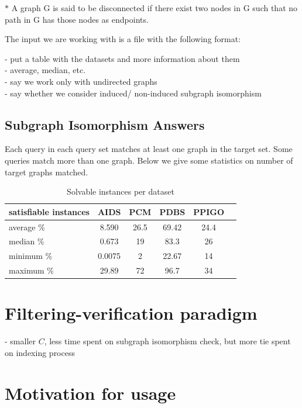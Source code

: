 \documentclass{l4proj}
\begin{document}
\small{$*$ A graph G is said to be disconnected if there exist two nodes in G such that no path in G has those nodes as endpoints.}

    The input we are working with is a file with the following format:\newline
    
    - put a table with the datasets and more information about them \\ 
    - average, median, etc. \\
    - say we work only with undirected graphs \\
    - say whether we consider induced/ non-induced subgraph isomorphism \\

\subsection{Subgraph Isomorphism Answers}
Each query in each query set matches at least one graph in the target set. Some queries match more than one graph. Below we give some statistics on number of target graphs matched.
\begin{table}[H]
\caption{Solvable instances per dataset}
\label{table:dataSAT}
\centering
\renewcommand{\arraystretch}{1.4}
\begin{tabular}{|>{\centering}m{1.5in}|c|c|c|c|c|}\hline

satisfiable instances & AIDS   & PCM  & PDBS  & PPIGO \\ 
 \hline
 average \%           & 8.590  & 26.5 & 69.42 & 24.4  \\
 median \%            & 0.673  & 19   & 83.3  & 26    \\
 minimum \%           & 0.0075 & 2    & 22.67 & 14    \\
 maximum \%           & 29.89  & 72   & 96.7  & 34    \\
 \hline
\end{tabular}
\end{table}


\section{Filtering-verification paradigm}
- smaller $C$, less time spent on subgraph isomorphism check, but more tie spent on indexing process

	\section{Motivation for usage}
\end{document}
